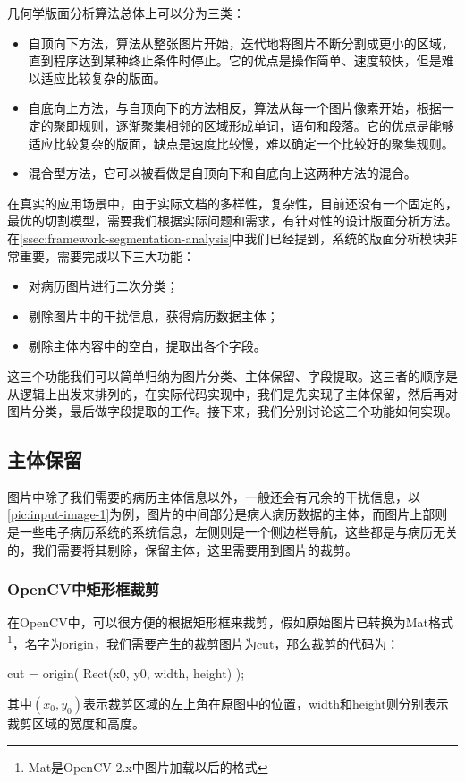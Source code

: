几何学版面分析算法总体上可以分为三类\citep{mao2003document}：
\begin{itemize}
	\item 自顶向下方法，算法从整张图片开始，迭代地将图片不断分割成更小的区域，直到程序达到某种终止条件时停止。它的优点是操作简单、速度较快，但是难以适应比较复杂的版面\citep{nagy1992prototype}\citep{baird1990image}。
	\item 自底向上方法，与自顶向下的方法相反，算法从每一个图片像素开始，根据一定的聚即规则，逐渐聚集相邻的区域形成单词，语句和段落。它的优点是能够适应比较复杂的版面，缺点是速度比较慢，难以确定一个比较好的聚集规则\citep{o1993document}\citep{kise1998segmentation}。
	\item 混合型方法，它可以被看做是自顶向下和自底向上这两种方法的混合\citep{pavlidis1992page}。
\end{itemize}

在真实的应用场景中，由于实际文档的多样性，复杂性，目前还没有一个固定的，最优的切割模型，需要我们根据实际问题和需求，有针对性的设计版面分析方法。在\autoref{ssec:framework-segmentation-analysis}中我们已经提到，系统的版面分析模块非常重要，需要完成以下三大功能：
\begin{itemize}
	\item 对病历图片进行二次分类；
	\item 剔除图片中的干扰信息，获得病历数据主体；
	\item 剔除主体内容中的空白，提取出各个字段。
\end{itemize}
这三个功能我们可以简单归纳为图片分类、主体保留、字段提取。这三者的顺序是从逻辑上出发来排列的，在实际代码实现中，我们是先实现了主体保留，然后再对图片分类，最后做字段提取的工作。接下来，我们分别讨论这三个功能如何实现。

\subsection{主体保留}
图片中除了我们需要的病历主体信息以外，一般还会有冗余的干扰信息，以\autoref{pic:input-image-1}为例，图片的中间部分是病人病历数据的主体，而图片上部则是一些电子病历系统的系统信息，左侧则是一个侧边栏导航，这些都是与病历无关的，我们需要将其剔除，保留主体，这里需要用到图片的裁剪。

\subsubsection*{OpenCV中矩形框裁剪}
在OpenCV中，可以很方便的根据矩形框来裁剪，假如原始图片已转换为Mat格式\footnote{Mat是OpenCV 2.x中图片加载以后的格式}，名字为origin，我们需要产生的裁剪图片为cut，那么裁剪的代码为：
\begin{Code}
cut = origin( Rect(x0, y0, width, height) );
\end{Code}
其中$(x_0,y_0)$表示裁剪区域的左上角在原图中的位置，width和height则分别表示裁剪区域的宽度和高度。

